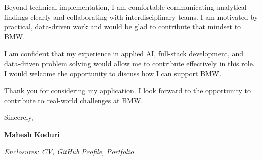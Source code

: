 \documentclass[11pt,a4paper]{letter}
\begin{document}
Beyond technical implementation, I am comfortable communicating analytical findings clearly and collaborating with interdisciplinary teams. I am motivated by practical, data-driven work and would be glad to contribute that mindset to BMW.

I am confident that my experience in applied AI, full-stack development, and data-driven problem solving would allow me to contribute effectively in this role. I would welcome the opportunity to discuss how I can support BMW.

Thank you for considering my application. I look forward to the opportunity to contribute to real-world challenges at BMW.

\vspace{0.5cm}

Sincerely,

\vspace{0.8cm}

\textbf{ Mahesh Koduri }

\vspace{0.5cm}

\textit{Enclosures: CV, GitHub Profile, Portfolio}
\end{document}
